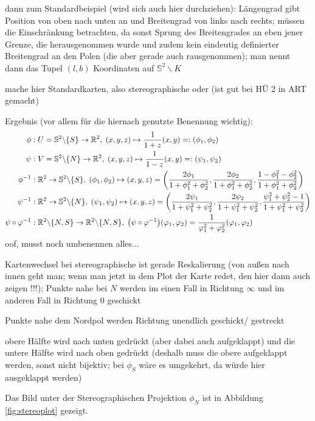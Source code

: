 \documentclass[../H_Analysis_main.tex]{subfiles}
\begin{document}
\begin{bsp}[2-Sphäre]
dann zum Standardbeispiel (wird sich auch hier durchziehen): Längengrad gibt Position von oben nach unten an und Breitengrad von links nach rechts; müssen die Einschränkung betrachten, da sonst Sprung des Breitengrades an eben jener Grenze, die herausgenommen wurde und zudem kein eindeutig definierter Breitengrad an den Polen (die aber gerade auch rausgenommen); man nennt dann das Tupel $(l, b)$ Koordinaten auf $\mathbb{S}^2 \backslash K$

mache hier Standardkarten, also stereographische oder (ist gut bei HÜ 2 in ART gemacht)

Ergebnis (vor allem für die hiernach genutzte Benennung wichtig):
\begin{align*}
\phi&: U = \mathbb{S}^2 \backslash \qty{S} \rightarrow \mathbb{R}^2, \; (x, y, z) \mapsto \frac{1}{1 + z} (x, y) =: (\phi_1, \phi_2)
\\
\psi&: V = \mathbb{S}^2 \backslash \qty{N} \rightarrow \mathbb{R}^2, \; (x, y, z) \mapsto \frac{1}{1 - z} (x, y) =: (\psi_1,\psi_2)
\\
\phi^{-1}&: \mathbb{R}^2 \rightarrow \mathbb{S}^2 \backslash \qty{S}, \; (\phi_1, \phi_2) \mapsto (x, y, z) = \qty(\frac{2 \phi_1}{1 + \phi_1^2 + \phi_2^2}, \frac{2 \phi_2}{1+ \phi_1^2 + \phi_2^2}, \frac{1 - \phi_1^2 - \phi_2^2}{1 + \phi_1^2 + \phi_2^2})
\\
\psi^{-1}&: \mathbb{R}^2 \rightarrow \mathbb{S}^2 \backslash \qty{N}, \; (\psi_1, \psi_2) \mapsto (x, y, z) = \qty(\frac{2 \psi_1}{1 + \psi_1^2 + \psi_2^2}, \frac{2 \psi_2}{1+ \psi_1^2 + \psi_2^2}, \frac{\psi_1^2 + \psi_2^2 - 1}{1 + \psi_1^2 + \psi_2^2})
\\
\psi \circ \varphi^{-1}&: \mathbb{R}^2 \backslash \qty{N, S} \rightarrow \mathbb{R}^2 \backslash \qty{N, S}, \;  \qty(\psi \circ \varphi^{-1})(\varphi_1, \varphi_2) = \frac{1}{\varphi_1^2 + \varphi_2^2} (\varphi_1, \varphi_2)
\end{align*}
oof, musst noch umbenennen alles...

Kartenwechsel bei stereographische ist gerade Reskalierung (von außen nach innen geht man; wenn man jetzt in dem Plot der Karte redet, den hier dann auch zeigen !!!);  Punkte nahe bei $N$ werden im einen Fall in Richtung $\infty$ und im anderen Fall in Richtung $0$ geschickt

Punkte nahe dem Nordpol werden Richtung unendlich geschickt/ gestreckt

obere Hälfte wird nach unten gedrückt (aber dabei auch aufgeklappt) und die untere Hälfte wird nach oben gedrückt (deshalb muss die obere aufgeklappt werden, sonst nicht bijektiv; bei $\phi_S$ wäre es umgekehrt, da würde hier ausgeklappt werden)

Das Bild unter der Stereographischen Projektion $\phi_N$ ist in Abbildung \ref{fig:stereoplot} gezeigt.
\end{bsp}
\end{document}
